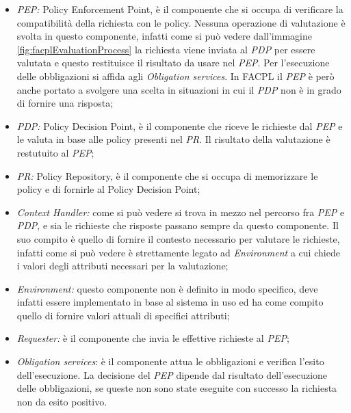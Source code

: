 \begin{itemize}
    \item \emph{PEP:} Policy Enforcement Point, è il componente che si occupa di verificare la compatibilità della richiesta con le policy. Nessuna operazione di valutazione è svolta in questo componente, infatti come si può vedere dall'immagine \ref{fig:facplEvaluationProcess} la richiesta viene inviata al \emph{PDP} per essere valutata e questo restituisce il risultato da usare nel \emph{PEP}. Per l'esecuzione delle obbligazioni si affida agli \emph{Obligation services}. In FACPL il \emph{PEP} è però anche portato a svolgere una scelta in situazioni in cui il \emph{PDP} non è in grado di fornire una risposta;
    \item \emph{PDP:} Policy Decision Point, è il componente che riceve le richieste dal \emph{PEP} e le valuta in base alle policy presenti nel \emph{PR}. Il risultato della valutazione è restutuito al \emph{PEP};
    \item \emph{PR:} Policy Repository, è il componente che si occupa di memorizzare le policy e di fornirle al Policy Decision Point;
    \item \emph{Context Handler:} come si può vedere si trova in mezzo nel percorso fra \emph{PEP} e \emph{PDP}, e sia le richieste che risposte passano sempre da questo componente. Il suo compito è quello di fornire il contesto necessario per valutare le richieste, infatti come si può vedere è strettamente legato ad \emph{Environment} a cui chiede i valori degli attributi necessari per la valutazione;
    \item \emph{Environment:} questo componente non è definito in modo specifico, deve infatti essere implementato in base al sistema in uso ed ha come compito quello di fornire valori attuali di specifici attributi;
    \item \emph{Requester:} è il componente che invia le effettive richieste al \emph{PEP};
    \item \emph{Obligation services}: è il componente attua le obbligazioni e verifica l'esito dell'esecuzione. La decisione del \emph{PEP} dipende dal risultato dell'esecuzione delle obbligazioni, se queste non sono state eseguite con successo la richiesta non da esito positivo.
\end{itemize}
